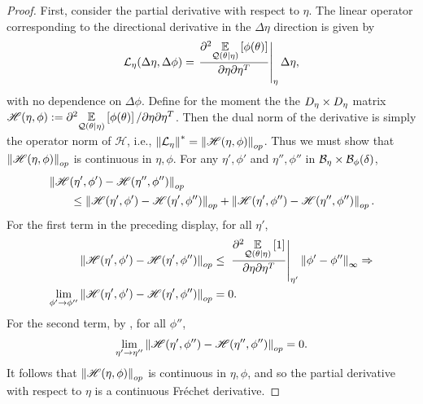 \begin{lem}
\begin{proof}
First, consider the partial derivative with respect to $\eta$.  The
linear operator corresponding to the directional derivative in the
$\Delta \eta$ direction is given by
%
\begin{align*}
%
\linop_\eta(\Delta \eta, \Delta \phi) =
    \fracat{\partial^2 \expect{\q(\theta \vert \eta)}{\phi(\theta)}}
           {\partial \eta \partial\eta^T}{\eta} \Delta \eta,
%
\end{align*}
%
with no dependence on $\Delta \phi$.  Define for the moment the the ${D_{\eta}}
\times {D_{\eta}}$ matrix $\mathscr{H}(\eta, \phi) := \partial^2 \underset{\mathcal{Q}(\theta
\vert \eta)}{\mathbb{E}}\left[\phi(\theta)\right] / \partial \eta \partial \eta^T$.  Then the dual norm
of the derivative is simply the operator norm of $\mathscr{H}$, i.e.,
$\left\Vert\mathcal{L}_\eta\right\Vert^* = \left\Vert\mathscr{H}(\eta, \phi)\right\Vert_{op}$. Thus we must show
that $\left\Vert\mathscr{H}(\eta, \phi)\right\Vert_{op}$ is continuous in $\eta, \phi$.  For
any $\eta', \phi'$ and $\eta'', \phi''$ in $\mathcal{B}_\eta \times
\mathcal{B}_\phi(\delta)$,
%
\begin{align*}
%
\MoveEqLeft
\norm{\mathscr{H}(\eta', \phi') - \mathscr{H}(\eta'', \phi'')}_{op} \\
&\le
\norm{\mathscr{H}(\eta', \phi') - \mathscr{H}(\eta', \phi'')}_{op} +
\norm{\mathscr{H}(\eta', \phi'') - \mathscr{H}(\eta'', \phi'')}_{op}.
%
\end{align*}
%
For the first term in the preceding display, for all $\eta'$,
%
\begin{align*}
%
\norm{\mathscr{H}(\eta', \phi') - \mathscr{H}(\eta', \phi'')}_{op}
    \le{}&
    \fracat{\partial^2 \expect{\q(\theta \vert \eta)}{1}}
           {\partial \eta \partial\eta^T}{\eta'} \norminf{\phi' - \phi''}
           \Rightarrow\\
\lim_{\phi' \rightarrow \phi''}
\norm{\mathscr{H}(\eta', \phi') - \mathscr{H}(\eta', \phi'')}_{op} ={}& 0.
%
\end{align*}
%
For the second term, by , for all $\phi''$,
%
\begin{align*}
%
\lim_{\eta' \rightarrow \eta''}
    \norm{\mathscr{H}(\eta', \phi'') - \mathscr{H}(\eta'', \phi'')}_{op} = 0.
%
\end{align*}
%
It follows that $\left\Vert\mathscr{H}(\eta, \phi)\right\Vert_{op}$ is continuous in $\eta,
\phi$, and so the partial derivative with respect to $\eta$ is
a continuous Fr{\'e}chet derivative.



\end{proof}
\end{lem}
